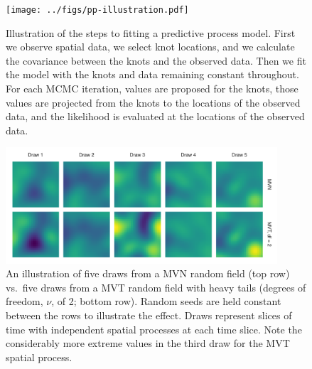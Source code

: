 \documentclass[12pt,english]{article}
\begin{document}
\begin{spacing}{1.25}
\begin{figure}[htb]
\begin{center}
  \texttt{[image: ../figs/pp-illustration.pdf]}
\caption{
Illustration of the steps to fitting a predictive process model.
First we observe spatial data, we select knot locations,
and we calculate the covariance between the knots and the observed data.
Then we fit the model with the knots and data remaining constant throughout.
For each MCMC iteration, values are proposed for the
knots, those values are projected from the knots to the locations of the observed data,
and the likelihood is evaluated at the locations of the observed data.}
\label{fig:didactic}
\end{center}
\end{figure}

\clearpage

\begin{figure}[htb]
\begin{center}
  \includegraphics[width=0.9\textwidth]{../figs/nu-rf-illustration.pdf}
\caption{An illustration of five draws from a MVN random field (top row)
vs.\ five draws from a MVT random field with heavy tails
(degrees of freedom, $\nu$, of 2; bottom row). Random seeds are held constant
between the rows
to illustrate the effect. Draws represent slices of time with independent spatial
processes at each time slice. Note the considerably more extreme values in
the third draw for the MVT spatial process.}
\label{fig:nu}
\end{center}
\end{figure}

\clearpage


\end{spacing}
\end{document}
